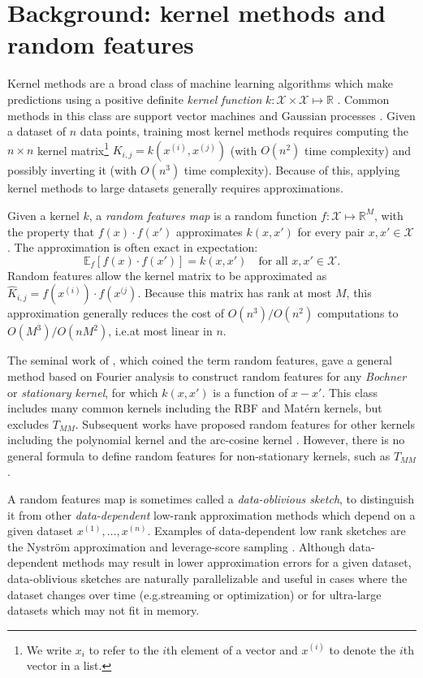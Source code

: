\section{Background: kernel methods and random features}

Kernel methods are a broad class of machine learning algorithms
which make predictions using a positive definite \emph{kernel function}
$k:\mathcal{X}\times\mathcal{X}\mapsto\mathbb{R}$
\citep{scholkopf2002learning}.
Common methods in this class are support vector machines \citep{cortes1995support}
and Gaussian processes \citep{williams2006gaussian}.
Given a dataset of $n$ data points,
training most kernel methods requires computing 
the $n\times n$ kernel matrix\footnote{
We write $x_i$ to refer to the $i$th element of a vector and $x^{(i)}$ to denote the $i$th vector in a list.
}
$K_{i,j} = k(x^{(i)},x^{(j)})$ (with $O(n^2)$ time complexity)
and possibly inverting it (with $O(n^3)$ time complexity).
Because of this, applying kernel methods to large datasets generally requires approximations.

Given a kernel $k$, a \emph{random features map} 
is a random function
$f:\mathcal{X}\mapsto\mathbb{R}^M$, with the property that  $f(x)\cdot f(x')$ approximates $k(x,x')$ for every pair $x,x'\in\mathcal X$. The approximation is often exact in expectation:
\begin{equation}\label{eqn:random-feature-definition}
    \mathbb{E}_f\left[f(x)\cdot f(x')\right]=k(x,x') \quad \text{for all }x,x'\in\mathcal X.
\end{equation}
Random features allow the kernel matrix to be approximated as 
$\widehat K_{i,j} = f(x^{(i)})\cdot f(x^{(j})$.
Because this matrix has rank at most $M$,
this approximation generally reduces the cost of $O(n^3)/O(n^2)$ computations to $O(M^3)/O(nM^2)$,
i.e.\@ at most linear in $n$.



The seminal work of \citet{rahimi2007random}, which coined the term random features, gave a general method based on Fourier analysis to construct random features for any \emph{Bochner} or \emph{stationary kernel}, for which $k(x,x')$ is a function of $x-x'$. This class includes many common kernels including the RBF and Mat\'{e}rn kernels, but excludes $T_{MM}$.
Subsequent works have proposed random features for other kernels including the polynomial kernel and the arc-cosine kernel 
\citep{liu2021random}.
However, there is no general formula to define random features for non-stationary kernels, such as $T_{MM}$.

A random features map is sometimes called a \emph{data-oblivious sketch}, to distinguish it from other \emph{data-dependent} low-rank approximation methods which depend on a given dataset $x^{(1)},\dots,x^{(n)}$.
Examples of data-dependent low rank sketches are the Nystr\"{o}m approximation and leverage-score sampling \citep{drineas2005nystrom,drineas2012fast}.
Although data-dependent methods may result in lower approximation errors for a given dataset,
data-oblivious sketches are naturally parallelizable and useful in cases where the dataset  changes over time (e.g.\@ streaming or optimization)
or for ultra-large datasets which may not fit in memory.




